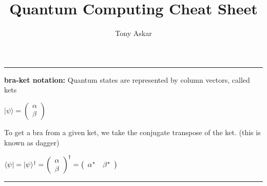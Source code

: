 \documentclass{article}
\title{\vspace{-4cm}
Quantum Computing Cheat Sheet
}
\author{ \vspace{-2cm}
Tony Askar
}
\date{} %
\begin{document}
\maketitle
\hrule
\vspace{5pt}

\textbf{bra-ket notation:} Quantum states are represented by column vectors, called kets
\begin{center}
$ |{\psi} \rangle = \left( 
				\begin{array}{c}
					 {\alpha}\\
					 {\beta}
				\end{array} 
			\right)$
\end{center}

\noindent To get a bra from a given ket, we take the conjugate transpose of the ket. (this is known as dagger)
\begin{center}
$\langle{\psi}| = |{\psi} \rangle^\dagger = 
			 \left(
				 \begin{array}{c} 
				 	{\alpha}\\
					{\beta}
				\end{array} 
			\right)^\dagger = \left( \begin{array}{c c} {\alpha}^* &  {\beta}^* \end{array} \right)$\\
\end{center}

\hrule 
\vspace{5pt}
\end{document}
